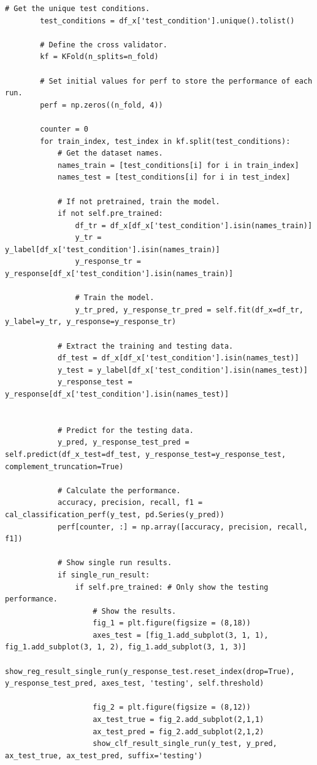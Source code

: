 \documentclass[11pt,a4paper]{article}
\begin{document}
\begin{lstlisting}[style=pyfull]
        # Get the unique test conditions.
        test_conditions = df_x['test_condition'].unique().tolist()

        # Define the cross validator.
        kf = KFold(n_splits=n_fold)

        # Set initial values for perf to store the performance of each run.
        perf = np.zeros((n_fold, 4))

        counter = 0
        for train_index, test_index in kf.split(test_conditions):
            # Get the dataset names.
            names_train = [test_conditions[i] for i in train_index]
            names_test = [test_conditions[i] for i in test_index]

            # If not pretrained, train the model.
            if not self.pre_trained:
                df_tr = df_x[df_x['test_condition'].isin(names_train)]
                y_tr = y_label[df_x['test_condition'].isin(names_train)]
                y_response_tr = y_response[df_x['test_condition'].isin(names_train)]

                # Train the model.
                y_tr_pred, y_response_tr_pred = self.fit(df_x=df_tr, y_label=y_tr, y_response=y_response_tr)

            # Extract the training and testing data.
            df_test = df_x[df_x['test_condition'].isin(names_test)]
            y_test = y_label[df_x['test_condition'].isin(names_test)]
            y_response_test = y_response[df_x['test_condition'].isin(names_test)]


            # Predict for the testing data.
            y_pred, y_response_test_pred = self.predict(df_x_test=df_test, y_response_test=y_response_test, complement_truncation=True)

            # Calculate the performance.
            accuracy, precision, recall, f1 = cal_classification_perf(y_test, pd.Series(y_pred))
            perf[counter, :] = np.array([accuracy, precision, recall, f1])

            # Show single run results.
            if single_run_result:
                if self.pre_trained: # Only show the testing performance.
                    # Show the results.
                    fig_1 = plt.figure(figsize = (8,18))
                    axes_test = [fig_1.add_subplot(3, 1, 1), fig_1.add_subplot(3, 1, 2), fig_1.add_subplot(3, 1, 3)]
                    show_reg_result_single_run(y_response_test.reset_index(drop=True), y_response_test_pred, axes_test, 'testing', self.threshold)

                    fig_2 = plt.figure(figsize = (8,12))
                    ax_test_true = fig_2.add_subplot(2,1,1)
                    ax_test_pred = fig_2.add_subplot(2,1,2)
                    show_clf_result_single_run(y_test, y_pred, ax_test_true, ax_test_pred, suffix='testing')


\end{lstlisting}
\end{document}
